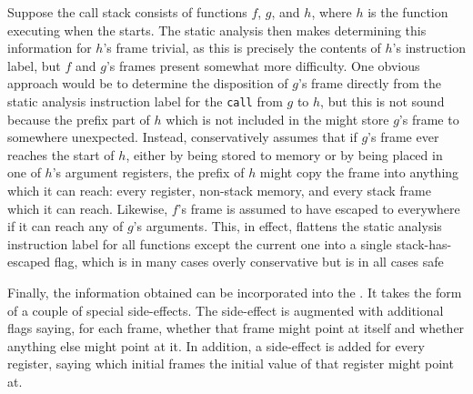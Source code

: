 Suppose the call stack consists of functions $f$, $g$, and $h$, where
$h$ is the function executing when the {\StateMachine} starts.  The
static analysis then makes determining this information for $h$'s frame trivial, as this
is precisely the contents of $h$'s instruction label, but $f$ and
$g$'s frames present somewhat more difficulty.  One obvious approach
would be to determine the disposition of $g$'s frame directly from the
static analysis instruction label for the \verb|call| from $g$ to $h$,
but this is not sound because the prefix part of $h$ which is not
included in the {\StateMachine} might store $g$'s frame to somewhere
unexpected.  Instead, {\technique} conservatively
assumes that if $g$'s frame ever reaches the start of $h$, either by
being stored to memory or by being placed in one of $h$'s argument
registers, the prefix of $h$ might copy the frame into anything which
it can reach: every register, non-stack memory, and every stack frame
which it can reach.  Likewise, $f$'s frame is assumed to have escaped
to everywhere if it can reach any of $g$'s arguments.  This, in
effect, flattens the static analysis instruction label for all
functions except the current one into a single stack-has-escaped flag,
which is in many cases overly conservative but is in all cases
safe

Finally, the information obtained can be incorporated into the
{\StateMachine}.  It takes the form of a couple of special
side-effects.  The  side-effect is augmented with
additional flags saying, for each frame, whether that frame might
point at itself and whether anything else might point at it.  In
addition, a  side-effect is added for every register,
saying which initial frames the initial value of that register might
point at.




